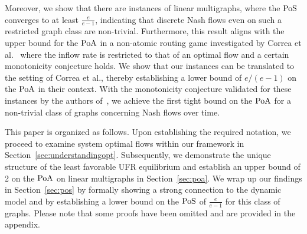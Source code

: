 Moreover, we show that there are instances of linear multigraphs, where the $\operatorname*{PoS}$ converges to at least $\frac{e}{e-1}$, indicating that discrete Nash flows even on such a restricted graph class are non-trivial. Furthermore, this result aligns with the upper bound for the $\operatorname*{PoA}$ in a non-atomic routing game investigated by Correa et al.~\cite{DBLP:journals/mor/CorreaCO22} where the inflow rate is restricted to that of an optimal flow and a certain monotonicity conjecture holds. %
We show that our instances can be translated to the setting of Correa et al., thereby establishing a lower bound of $e/(e-1)$ on the $\operatorname*{PoA}$ in their context. With the monotonicity conjecture validated for these instances by the authors of~\cite{DBLP:journals/mor/CorreaCO22}, we achieve the first tight bound on the $\operatorname*{PoA}$ for a non-trivial class of graphs concerning Nash flows over time.

This paper is organized as follows. Upon establishing the required notation, we proceed to examine system optimal flows within our framework in Section~\ref{sec:understandingopt}. Subsequently, we demonstrate the unique structure of the least favorable UFR equilibrium and establish an upper bound of 2 on the $\operatorname*{PoA}$ on linear multigraphs in Section~\ref{sec:poa}. We wrap up our findings in Section~\ref{sec:pos} by formally showing a strong connection to the dynamic model and by establishing a lower bound on the $\operatorname*{PoS}$ of $\frac{e}{e-1}$ for this class of graphs. Please note that some proofs have been omitted and are provided in the appendix.